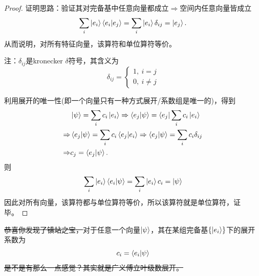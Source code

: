 \documentclass[12pt,a4paper,openany,twoside]{book}
\numberwithin{equation}{section}
\begin{document}
    \begin{proof}
      证明思路：验证其对完备基中任意向量都成立$\Rightarrow$空间内任意向量皆成立
      \begin{equation}
        \sum_i{\ket{e_i}\bra{e_i}\ket{e_j}}=\sum_i{\ket{e_i}\delta_{ij}}=\ket{e_j}.
      \end{equation}
      从而说明，对所有特征向量，该算符和单位算符等价。

      注：$\delta_{ij}$是kronecker $\delta$符号，其含义为
      \begin{equation}
        \delta_{ij}=
        \begin{cases}
          1,\ i=j\\
          0,\ i\neq j
        \end{cases}
      \end{equation}

      利用展开的唯一性(即一个向量只有一种方式展开/系数组是唯一的)，得到
      \begin{equation}
        \begin{aligned}
          &\ket{\psi}=\sum_i{c_i\ket{e_i}}\Rightarrow\bra{e_j}\ket{\psi}=\bra{e_j}\sum_i{c_i\ket{e_i}}\\
          \Rightarrow&\bra{e_j}\ket{\psi}=\sum_i{c_i\bra{e_j}\ket{e_i}}\Rightarrow\bra{e_j}\ket{\psi}=\sum_i{c_i\delta_{ij}}\\
          \Rightarrow&c_j=\bra{e_j}\ket{\psi}.
        \end{aligned}
      \end{equation}
      则
      \begin{equation}
        \sum_i{\ket{e_i}\bra{e_i}\ket{\psi}}=\sum_i{\ket{e_i}c_i}=\ket{\psi}
      \end{equation}
      因此对所有向量，该算符都与单位算符等价，所以该算符就是单位算符，证毕。
    \end{proof}
    \sout{恭喜你发现了镇站之宝，}对于任意一个向量$\ket{\psi}$，其在某组完备基$\qty{\ket{e_i}}$下的展开系数为
    \begin{equation}
      c_i=\bra{e_i}\ket{\psi} 
      \label{expansion coeff}
    \end{equation}
    \sout{是不是有那么一点感觉？其实就是广义傅立叶级数展开。}
\end{document}
